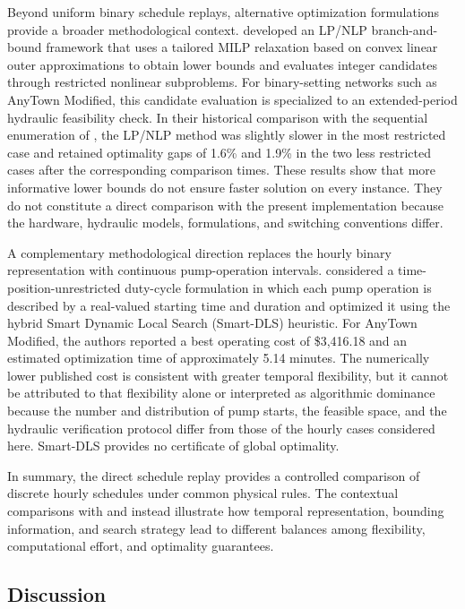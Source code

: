 \documentclass[Journal,letterpaper,InsideFigs]{ascelike-new}
\begin{document}
Beyond uniform binary schedule replays, alternative optimization formulations provide a broader methodological context.  developed an LP/NLP branch-and-bound framework that uses a tailored MILP relaxation based on convex linear outer approximations to obtain lower bounds and evaluates integer candidates through restricted nonlinear subproblems. For binary-setting networks such as AnyTown Modified, this candidate evaluation is specialized to an extended-period hydraulic feasibility check. In their historical comparison with the sequential enumeration of , the LP/NLP method was slightly slower in the most restricted case and retained optimality gaps of 1.6\% and 1.9\% in the two less restricted cases after the corresponding comparison times. These results show that more informative lower bounds do not ensure faster solution on every instance. They do not constitute a direct comparison with the present implementation because the hardware, hydraulic models, formulations, and switching conventions differ.

A complementary methodological direction replaces the hourly binary representation with continuous pump-operation intervals.  considered a time-position-unrestricted duty-cycle formulation in which each pump operation is described by a real-valued starting time and duration and optimized it using the hybrid Smart Dynamic Local Search (Smart-DLS) heuristic. For AnyTown Modified, the authors reported a best operating cost of \$3,416.18 and an estimated optimization time of approximately 5.14 minutes. The numerically lower published cost is consistent with greater temporal flexibility, but it cannot be attributed to that flexibility alone or interpreted as algorithmic dominance because the number and distribution of pump starts, the feasible space, and the hydraulic verification protocol differ from those of the hourly cases considered here. Smart-DLS provides no certificate of global optimality.

In summary, the direct schedule replay provides a controlled comparison of discrete hourly schedules under common physical rules. The contextual comparisons with  and  instead illustrate how temporal representation, bounding information, and search strategy lead to different balances among flexibility, computational effort, and optimality guarantees.

\subsection{Discussion}
\end{document}
